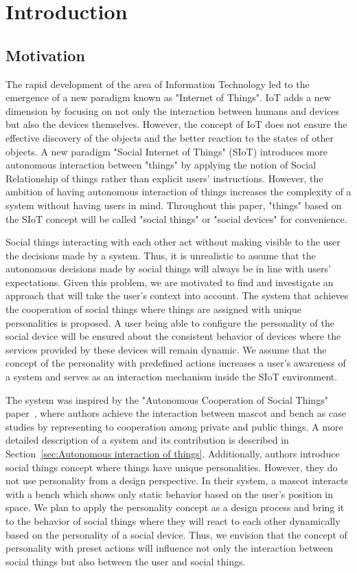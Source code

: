 \chapter{Introduction}
\label{ch:introduction}

\section{Motivation}
\label{sec:motivation}
The rapid development of the area of Information Technology led to the
emergence of a new paradigm known as "Internet of Things".
IoT adds a new dimension by focusing on not only the interaction between
humans and devices but also the devices themselves.
However, the concept of IoT does not ensure the effective discovery of the
objects and the better reaction to the states of other objects.
A new paradigm "Social Internet of Things" (SIoT) introduces more autonomous
interaction between "things" by applying the notion of Social Relationship of
things rather than explicit users' instructions.
However, the ambition of having autonomous interaction of things increases
the complexity of a system without having users in mind.
Throughout this paper, "things" based on the SIoT concept will be called
"social things" or "social devices" for convenience.

Social things interacting with each other act without making visible to the
user the decisions made by a system.
Thus, it is unrealistic to assume that the autonomous decisions made by
social things will always be in line with users' expectations.
Given this problem, we are motivated to find and investigate an approach
that will take the user's context into account.
The system that achieves the cooperation of social things
where things are assigned with unique personalities is proposed.
A user being able to configure the personality of the social device will be ensured about
the consistent behavior of devices where the services provided by these devices will remain dynamic.
We assume that the concept of the personality with predefined actions increases a user's
awareness of a system and serves as an interaction mechanism inside the SIoT environment.

The system was inspired by the "Autonomous Cooperation of Social Things"
paper~\cite{okada2016autonomous},
where authors achieve the interaction between mascot and bench as case
studies by representing to cooperation among private and public things.
A more detailed description of a system and its contribution is described
in Section~\ref{sec:Autonomous interaction of things}.
Additionally, authors introduce social things concept where things have unique personalities.
However, they do not use personality from a design perspective.
In their system, a mascot interacts with a bench which shows only static behavior based on the user's position in space.
We plan to apply the personality concept as a design process and bring it to the
behavior of social things where they will react to each other dynamically based on the personality of a social device.
Thus, we envision that the concept of personality with preset actions will influence
not only the interaction between social things but also between the user and social things.

